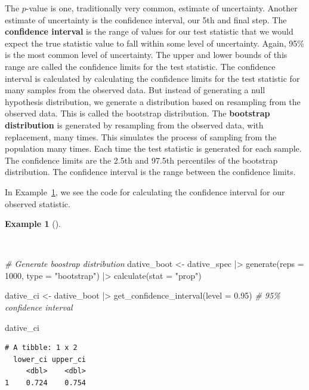 \documentclass[
  letterpaper,
]{latex/krantz}
\newenvironment{Shaded}{\begin{snugshade}}{\end{snugshade}}
\newcommand{\AttributeTok}[1]{\textcolor[rgb]{0.00,0.00,0.00}{#1}}
\newcommand{\CommentTok}[1]{\textcolor[rgb]{0.00,0.00,0.00}{\textit{#1}}}
\newcommand{\DecValTok}[1]{\textcolor[rgb]{0.00,0.00,0.00}{#1}}
\newcommand{\FloatTok}[1]{\textcolor[rgb]{0.00,0.00,0.00}{#1}}
\newcommand{\FunctionTok}[1]{\textcolor[rgb]{0.00,0.00,0.00}{#1}}
\newcommand{\NormalTok}[1]{\textcolor[rgb]{0.00,0.00,0.00}{#1}}
\newcommand{\OtherTok}[1]{\textcolor[rgb]{0.00,0.00,0.00}{#1}}
\newcommand{\SpecialCharTok}[1]{\textcolor[rgb]{0.00,0.00,0.00}{#1}}
\newcommand{\StringTok}[1]{\textcolor[rgb]{0.00,0.00,0.00}{#1}}
\theoremstyle{definition}
\newtheorem{example}{Example}[chapter]
\theoremstyle{remark}
\begin{document}
The \(p\)-value is one, traditionally very common, estimate of
uncertainty. Another estimate of uncertainty is the confidence interval,
our 5th and final step. The \textbf{confidence interval} is the range of
values for our test statistic that we would expect the true statistic
value to fall within some level of uncertainty. Again, 95\% is the most
common level of uncertainty. The upper and lower bounds of this range
are called the confidence limits for the test statistic. The confidence
interval is calculated by calculating the confidence limits for the test
statistic for many samples from the observed data. But instead of
generating a null hypothesis distribution, we generate a distribution
based on resampling from the observed data. This is called the bootstrap
distribution. The \textbf{bootstrap distribution} is generated by
resampling from the observed data, with replacement, many times. This
simulates the process of sampling from the population many times. Each
time the test statistic is generated for each sample. The confidence
limits are the 2.5th and 97.5th percentiles of the bootstrap
distribution. The confidence interval is the range between the
confidence limits.

In Example~\ref{exm-infer-cat-confidence-interval}, we see the code for
calculating the confidence interval for our observed statistic.

\begin{example}[]\protect\hypertarget{exm-infer-cat-confidence-interval}{}\label{exm-infer-cat-confidence-interval}

~

\begin{Shaded}
\begin{Highlighting}[]
\CommentTok{\# Generate boostrap distribution}
\NormalTok{dative\_boot }\OtherTok{\textless{}{-}}
\NormalTok{  dative\_spec }\SpecialCharTok{|\textgreater{}}
  \FunctionTok{generate}\NormalTok{(}\AttributeTok{reps =} \DecValTok{1000}\NormalTok{, }\AttributeTok{type =} \StringTok{"bootstrap"}\NormalTok{) }\SpecialCharTok{|\textgreater{}}
  \FunctionTok{calculate}\NormalTok{(}\AttributeTok{stat =} \StringTok{"prop"}\NormalTok{)}

\NormalTok{dative\_ci }\OtherTok{\textless{}{-}}
\NormalTok{  dative\_boot }\SpecialCharTok{|\textgreater{}}
  \FunctionTok{get\_confidence\_interval}\NormalTok{(}\AttributeTok{level =} \FloatTok{0.95}\NormalTok{) }\CommentTok{\# 95\% confidence interval}

\NormalTok{dative\_ci}
\end{Highlighting}
\end{Shaded}

\begin{verbatim}
# A tibble: 1 x 2
  lower_ci upper_ci
     <dbl>    <dbl>
1    0.724    0.754
\end{verbatim}

\end{example}
\end{document}
